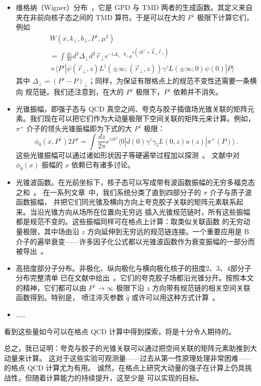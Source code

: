 \begin{itemize}
\item{维格纳（Wigner）分布~\cite{viewing}，它是 GPD 与 TMD 两者的生成函数。其定义来自夹在非前向核子态之间的
TMD 算符。于是可以在大的 $P^z$ 极限下计算它们，例如
\begin{eqnarray}
  &&  W(x,k_\perp,b_\perp, P^z, \mu^2) \\ &&
  = \int \frac{dz}{4\pi} d^2\Delta_\perp d^2\vec{r}_\perp e^{-i\Delta_\perp \cdot b_\perp} e^{i(zk^z+\vec{k}_\perp \vec{r}_\perp)}\nonumber
    \\ && \times \langle P'|\overline{\psi}(\vec{r}_\perp,z)L^\dagger(\pm\infty; (\vec{r}_\perp,z))\gamma^z L(\pm\infty; 0)\psi(0) |P\rangle \nonumber
\end{eqnarray}
其中 $\Delta_\perp =(P'-P)_\perp$；同样，为保证有限格点上的规范不变性还需要一条横向
规范链。我们还注意到，在大的 $P^z$ 极限下，$P^z$ 依赖并不消失。}

\item{光锥振幅，即强子态与 QCD 真空之间、夸克与胶子插值场光锥关联的矩阵元素。我们现在可以把它们作为大动量极限下空间关联的矩阵元来计算。例如，$\pi^+$
介子的领头光锥振幅即为下式的大 $P^z$ 极限：
\begin{equation}
\phi_0(x, P^z) 2P^z = \int \frac{dz}{2\pi} e^{izk^z}
\langle 0|\overline{d}(0)\gamma^z\gamma_5
L(0,z)u(z)| \pi^+(P)\rangle \ .
\end{equation}
这些光锥振幅可以通过诸如形状因子等硬遍举过程加以探测~\cite{Lepage:1980fj,Belitsky:2002kj}。
文献中对 $\phi_0(x)$ 振幅的 $x$ 依赖已有诸多讨论。}

\item{光锥波函数。在光前坐标下，核子态可以写成带有波函数振幅的无穷多福克态之和~\cite{brodsky}。
在一系列文章~\cite{Ji:2002xn}中，我们系统分类了直到四部分子的 $\pi$ 介子与质子波函数振幅，
并把它们同光锥及横向方向上夸克胶子关联的矩阵元素联系起来。当沿光锥方向从场所在位置向无穷远
插入光锥规范链时，所有这些振幅都是规范不变的。这些振幅同样可在格点上计算：取类似关联函数
的无穷动量极限，其中场由沿 $z$ 方向延伸到无穷远的规范链连接。一个重要应用是 B 介子的遍举衰变——许多因子化公式都以光锥波函数作为衰变振幅的一部分而被导出~\cite{li}。}

\item{高扭度部分子分布。非极化、纵向极化与横向极化核子的扭度2、3、4部分子分布完整清单
已在文献中给出~\cite{Ellis:1982cd}。它们的夸克胶子场都沿光锥分开。按照本文的精神，它们都可以由 $P^z \rightarrow \infty$ 极限下沿 $z$ 方向带有规范链的相关空间关联函数得到。特别是，
喷注淬灭参数 $\hat q$ 或许可以用这种方式计算~\cite{Majumder:2012sh}。}

\item{……}

\end{itemize}
看到这些量如今可以在格点 QCD 计算中得到探索，将是十分令人期待的。

总之，我已证明：夸克与胶子的光锥关联可以通过把空间关联的矩阵元素助推到大动量来计算。
这对于这些实验可观测量——过去从第一性原理处理非常困难——的格点 QCD 计算尤为有用。
诚然，在格点上研究大动量的强子在计算上仍具挑战性，但随着计算能力的持续提升，这至少是
可以实现的目标。
